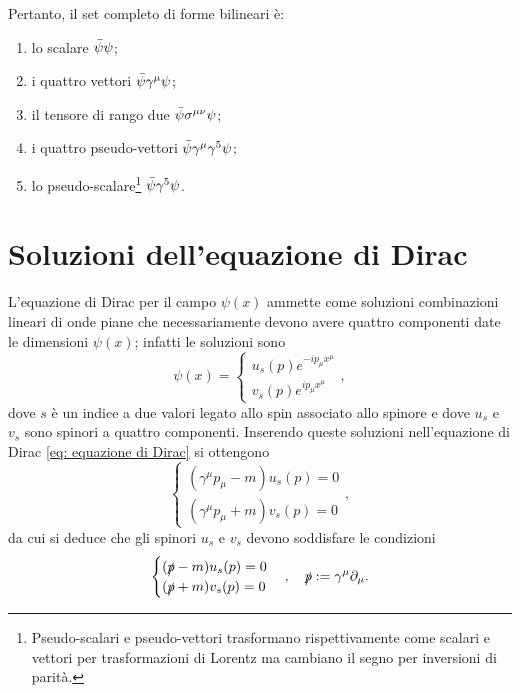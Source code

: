 Pertanto, il set completo di forme bilineari è:
\begin{enumerate}
    \item lo scalare $\bar{\psi}\psi$;
    \item i quattro vettori $\bar{\psi}\gamma^\mu\psi$;
    \item il tensore di rango due $\bar{\psi}\sigma^{\mu\nu}\psi$;
    \item i quattro pseudo-vettori $\bar{\psi}\gamma^\mu\gamma^5\psi$;
    \item lo pseudo-scalare\footnote{Pseudo-scalari e pseudo-vettori trasformano rispettivamente come scalari e vettori per trasformazioni di Lorentz ma cambiano il segno per inversioni di parità.} $\bar{\psi}\gamma^5\psi$.
\end{enumerate}

\section{Soluzioni dell'equazione di Dirac}
L'equazione di Dirac per il campo $\psi(x)$ ammette come soluzioni combinazioni lineari di onde piane che necessariamente devono avere quattro componenti date le dimensioni $\psi(x)$; infatti le soluzioni sono
\begin{equation}
    \psi(x) = 
    \begin{cases}
        u_s(p)e^{-ip_\mu x^\mu} \\
        v_s(p)e^{ip_\mu x^\mu}
    \end{cases},
\end{equation}
dove $s$ è un indice a due valori legato allo spin associato allo spinore e dove $u_s$ e $v_s$ sono spinori a quattro componenti. Inserendo queste soluzioni nell'equazione di Dirac \eqref{eq: equazione di Dirac} si ottengono
\begin{equation}
    \begin{cases}
        (\gamma^\mu p_\mu - m)u_s(p) = 0 \\
        (\gamma^\mu p_\mu + m)v_s(p) = 0
    \end{cases},
\end{equation}
da cui si deduce che gli spinori $u_s$ e $v_s$ devono soddisfare le condizioni
\begin{equation}
\label{eq: equazioni spinori u e v}
    \begin{cases}
        (\slashed{p} - m)u_s(p) = 0 \\
        (\slashed{p} + m)v_s(p) = 0
    \end{cases},\quad\slashed{p} := \gamma^\mu\partial_\mu.
\end{equation}
